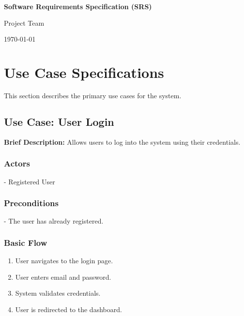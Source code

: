 \documentclass[12pt]{article}
\begin{document}
\begin{titlepage}
  \centering
  \vspace*{\fill}

  {\LARGE\bfseries Software Requirements Specification (SRS)\par}
  \vspace{1cm}

  {\Large Project Team\par}
  \vspace{0.5cm}

  {\large \today\par}

  \vspace*{\fill}
\end{titlepage}

\tableofcontents
\listoffigures
\listoftables
\newpage

\section{Use Case Specifications}
\label{sec:usecases}

This section describes the primary use cases for the system.

\subsection{Use Case: User Login}
\label{sec:login}

\textbf{Brief Description:} Allows users to log into the system using their credentials.

\subsubsection*{Actors}
- Registered User

\subsubsection*{Preconditions}
- The user has already registered.

\subsubsection*{Basic Flow}
\begin{enumerate}
    \item User navigates to the login page.
    \item User enters email and password.
    \item System validates credentials.
    \item User is redirected to the dashboard.
\end{enumerate}
\end{document}
